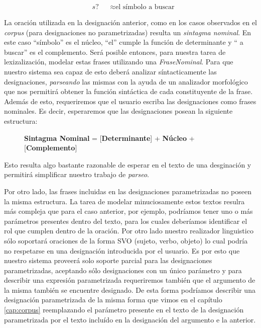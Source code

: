 \begin{figure}[H]
\begin{align*} 
  &s? && \approx \text{el símbolo a buscar}
\end{align*}
\end{figure}

La oración utilizada en la designación anterior, como en los casos observados en el \textit{corpus} (para designaciones no parametrizadas) resulta un \emph{sintagma nominal}. En este caso ``símbolo'' es el núcleo, ``el'' cumple la función de determinante y `` a buscar'' es el complemento. Será posible entonces, para nuestra tarea de lexizalización, modelar estas frases utilizando una \emph{FraseNominal}. Para que nuestro sistema sea capaz de esto deberá analizar síntacticamente las designaciones, \textit{parseando} las mismas con la ayuda de un analizador morfológico que nos permitirá obtener la función sintáctica de cada constituyente de la frase. Además de esto, requeriremos que el usuario escriba las designaciones como frases nominales. Es decir, esperaremos que las designaciones posean la siguiente estructura:

\begin{figure}[H]
  \centering
   \textbf{Sintagma Nominal} = [\textbf{Determinante}] + \textbf{Núcleo} + [\textbf{Complemento}]
\end{figure}

Esto resulta algo bastante razonable de esperar en el texto de una desginación y permitirá simplificar nuestro trabajo de \emph{parseo}. 

Por otro lado, las frases incluidas en las designaciones parametrizadas no poseen la misma estructura. La tarea de modelar minuciosamente estos textos resulra más compleja que para el caso anterior, por ejemplo, podríamos tener uno o más parámetros presentes dentro del texto, para los cuales deberíamos identificar el rol que cumplen dentro de la oración. Por otro lado nuestro realizador linguistico sólo soportará oraciones de la forma SVO (sujeto, verbo, objeto) lo cual podría no respetarse en una designación introducida por el usuario. Es por esto que nuestro sistema proveerá solo soporte parcial para las designaciones parametrizadas, aceptando sólo designaciones con un único parámetro y para describir una expresión parametrizada requeriremos también que el argumento de la misma también se encuentre designado. De esta forma podríamos describir una designación parametrizada de la misma forma que vimos en el capítulo \ref{cap:corpus} reemplazando el parámetro presente en el texto de la designación parametrizada por el texto incluído en la designación del argumento e la anterior.

